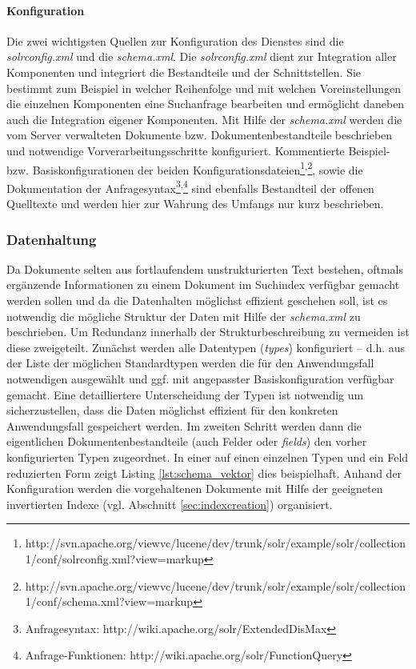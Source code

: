 \paragraph{Konfiguration} Die zwei wichtigsten Quellen zur Konfiguration des Dienstes sind die \textit{solrconfig.xml} und die \textit{schema.xml}. Die \textit{solrconfig.xml} dient zur Integration aller Komponenten und integriert die Bestandteile und der Schnittstellen. Sie bestimmt zum Beispiel in welcher Reihenfolge und mit welchen Voreinstellungen die einzelnen Komponenten eine Suchanfrage bearbeiten und ermöglicht daneben auch die Integration eigener Komponenten. Mit Hilfe der  \textit{schema.xml} werden die vom Server verwalteten Dokumente bzw. Dokumentenbestandteile beschrieben und notwendige Vorverarbeitungsschritte konfiguriert. Kommentierte Beispiel- bzw. Basiskonfigurationen der beiden Konfigurationsdateien\footnote{\tiny{http://svn.apache.org/viewvc/lucene/dev/trunk/solr/example/solr/collection1/conf/solrconfig.xml?view=markup}}\textsuperscript{,}\footnote{\tiny{http://svn.apache.org/viewvc/lucene/dev/trunk/solr/example/solr/collection1/conf/schema.xml?view=markup}}, sowie die Dokumentation der Anfragesyntax\footnote{\tiny{Anfragesyntax: http://wiki.apache.org/solr/ExtendedDisMax}}\textsuperscript{,}\footnote{\tiny{Anfrage-Funktionen: http://wiki.apache.org/solr/FunctionQuery}} sind ebenfalls Bestandteil der offenen Quelltexte und werden hier zur Wahrung des Umfangs nur kurz beschrieben.

\subsubsection{Datenhaltung}

Da Dokumente selten aus fortlaufendem unstrukturierten Text bestehen, oftmals ergänzende Informationen zu einem Dokument im Suchindex verfügbar gemacht werden sollen und da die Datenhalten möglichst effizient geschehen soll, ist es notwendig die mögliche Struktur der Daten mit Hilfe der \textit{schema.xml} zu beschrieben. Um Redundanz innerhalb der Strukturbeschreibung zu vermeiden ist diese zweigeteilt. Zunächst werden alle Datentypen (\textit{types}) konfiguriert -- d.h. aus der Liste der möglichen Standardtypen werden die für den Anwendungsfall notwendigen ausgewählt und ggf. mit angepasster Basiskonfiguration verfügbar gemacht. Eine detailliertere Unterscheidung der Typen ist notwendig um sicherzustellen, dass die Daten möglichst effizient für den konkreten Anwendungsfall gespeichert werden. Im zweiten Schritt werden dann die eigentlichen Dokumentenbestandteile (auch Felder oder \textit{fields}) den vorher konfigurierten Typen zugeordnet. In einer auf einen einzelnen Typen und ein Feld reduzierten Form zeigt Listing \ref{lst:schema_vektor} dies beispielhaft. Anhand der Konfiguration werden die vorgehaltenen Dokumente mit Hilfe der geeigneten invertierten Indexe (vgl. Abschnitt \ref{sec:indexcreation}) organisiert.

